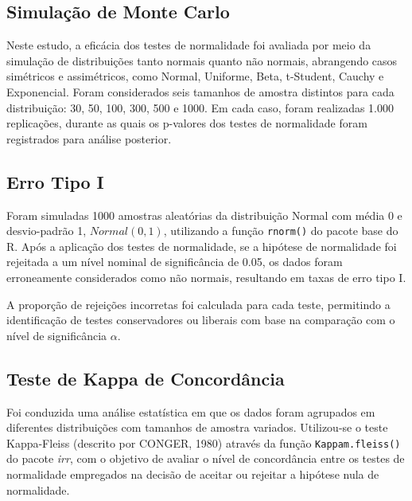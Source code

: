 \documentclass[a4paper,11pt]{article} %
\begin{document}
\subsection{Simulação de Monte Carlo}
Neste estudo, a eficácia dos testes de normalidade foi avaliada por meio da simulação de distribuições tanto normais quanto não normais, abrangendo casos simétricos e assimétricos, como Normal, Uniforme, Beta, t-Student, Cauchy e Exponencial. Foram considerados seis tamanhos de amostra distintos para cada distribuição: 30, 50, 100, 300, 500 e 1000. Em cada caso, foram realizadas 1.000 replicações, durante as quais os p-valores dos testes de normalidade foram registrados para análise posterior. \vskip0.3cm















\subsection{Erro Tipo I}
Foram simuladas 1000 amostras aleatórias da distribuição Normal com média 0 e desvio-padrão 1, $Normal(0, 1)$, utilizando a função \texttt{rnorm()} do pacote base do R. Após a aplicação dos testes de normalidade, se a hipótese de normalidade foi rejeitada a um nível nominal de significância de 0.05, os dados foram erroneamente considerados como não normais, resultando em taxas de erro tipo I. \vskip0.3cm

A proporção de rejeições incorretas foi calculada para cada teste, permitindo a identificação de testes conservadores ou liberais com base na comparação com o nível de significância $\alpha$.

\subsection{Teste de Kappa de Concordância}
Foi conduzida uma análise estatística em que os dados foram agrupados em diferentes distribuições com tamanhos de amostra variados. Utilizou-se o teste Kappa-Fleiss (descrito por CONGER, 1980) através da função \texttt{Kappam.fleiss()} do pacote \textit{irr}, com o objetivo de avaliar o nível de concordância entre os testes de normalidade empregados na decisão de aceitar ou rejeitar a hipótese nula de normalidade. \vskip0.3cm
\end{document}
